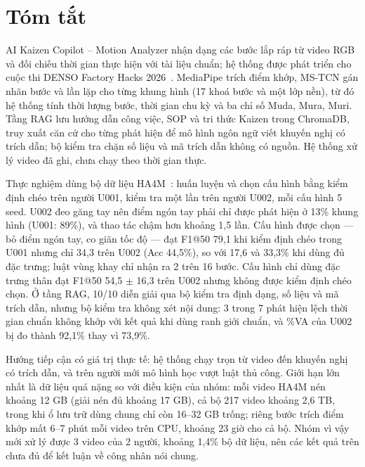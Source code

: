 \section*{Tóm tắt}

AI Kaizen Copilot – Motion Analyzer nhận dạng các bước lắp ráp từ video RGB và đối chiếu thời gian thực hiện với tài liệu chuẩn; hệ thống được phát triển cho cuộc thi DENSO Factory Hacks 2026~\citep{denso}. MediaPipe trích điểm khớp, MS-TCN gán nhãn bước và lần lặp cho từng khung hình (17 khoá bước và một lớp nền), từ đó hệ thống tính thời lượng bước, thời gian chu kỳ và ba chỉ số Muda, Mura, Muri. Tầng RAG lưu hướng dẫn công việc, SOP và tri thức Kaizen trong ChromaDB, truy xuất căn cứ cho từng phát hiện để mô hình ngôn ngữ viết khuyến nghị có trích dẫn; bộ kiểm tra chặn số liệu và mã trích dẫn không có nguồn. Hệ thống xử lý video đã ghi, chưa chạy theo thời gian thực.

Thực nghiệm dùng bộ dữ liệu HA4M~\citep{ha4m}: huấn luyện và chọn cấu hình bằng kiểm định chéo trên người U001, kiểm tra một lần trên người U002, mỗi cấu hình 5 seed. U002 đeo găng tay nên điểm ngón tay phải chỉ được phát hiện ở 13\% khung hình (U001: 89\%), và thao tác chậm hơn khoảng 1,5 lần. Cấu hình được chọn — bỏ điểm ngón tay, co giãn tốc độ — đạt F1@50 79,1 khi kiểm định chéo trong U001 nhưng chỉ 34,3 trên U002 (Acc 44,5\%), so với 17,6 và 33,3\% khi dùng đủ đặc trưng; luật vùng khay chỉ nhận ra 2 trên 16 bước. Cấu hình chỉ dùng đặc trưng thân đạt F1@50 54,5 $\pm$ 16,3 trên U002 nhưng không được kiểm định chéo chọn. Ở tầng RAG, 10/10 diễn giải qua bộ kiểm tra định dạng, số liệu và mã trích dẫn, nhưng bộ kiểm tra không xét nội dung: 3 trong 7 phát hiện lệch thời gian chuẩn không khớp với kết quả khi dùng ranh giới chuẩn, và \%VA của U002 bị đo thành 92,1\% thay vì 73,9\%.

Hướng tiếp cận có giá trị thực tế: hệ thống chạy trọn từ video đến khuyến nghị có trích dẫn, và trên người mới mô hình học vượt luật thủ công. Giới hạn lớn nhất là dữ liệu quá nặng so với điều kiện của nhóm: mỗi video HA4M nén khoảng 12 GB (giải nén đủ khoảng 17 GB), cả bộ 217 video khoảng 2,6 TB, trong khi ổ lưu trữ dùng chung chỉ còn 16–32 GB trống; riêng bước trích điểm khớp mất 6–7 phút mỗi video trên CPU, khoảng 23 giờ cho cả bộ. Nhóm vì vậy mới xử lý được 3 video của 2 người, khoảng 1,4\% bộ dữ liệu, nên các kết quả trên chưa đủ để kết luận về công nhân nói chung.

